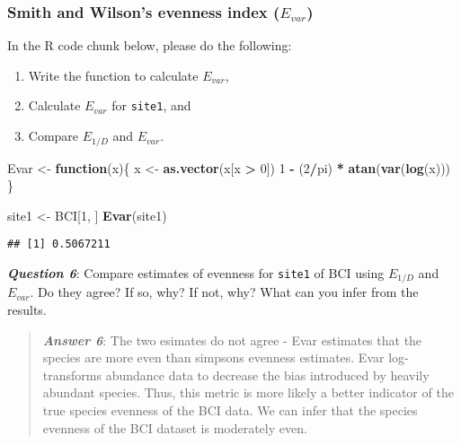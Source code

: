 \documentclass[
]{article}
\newenvironment{Shaded}{\begin{snugshade}}{\end{snugshade}}
\newcommand{\ControlFlowTok}[1]{\textcolor[rgb]{0.13,0.29,0.53}{\textbf{#1}}}
\newcommand{\DecValTok}[1]{\textcolor[rgb]{0.00,0.00,0.81}{#1}}
\newcommand{\FunctionTok}[1]{\textcolor[rgb]{0.13,0.29,0.53}{\textbf{#1}}}
\newcommand{\NormalTok}[1]{#1}
\newcommand{\OtherTok}[1]{\textcolor[rgb]{0.56,0.35,0.01}{#1}}
\newcommand{\SpecialCharTok}[1]{\textcolor[rgb]{0.81,0.36,0.00}{\textbf{#1}}}
\begin{document}
\subsubsection{\texorpdfstring{Smith and Wilson's evenness index
(\(E_{var}\))}{Smith and Wilson's evenness index (E\_\{var\})}}\label{smith-and-wilsons-evenness-index-e_var}

In the R code chunk below, please do the following:

\begin{enumerate}
\def\labelenumi{\arabic{enumi}.}
\item
  Write the function to calculate \(E_{var}\),
\item
  Calculate \(E_{var}\) for \texttt{site1}, and
\item
  Compare \(E_{1/D}\) and \(E_{var}\).
\end{enumerate}

\begin{Shaded}
\begin{Highlighting}[]
\NormalTok{Evar }\OtherTok{\textless{}{-}} \ControlFlowTok{function}\NormalTok{(x)\{}
\NormalTok{  x }\OtherTok{\textless{}{-}} \FunctionTok{as.vector}\NormalTok{(x[x }\SpecialCharTok{\textgreater{}} \DecValTok{0}\NormalTok{])}
  \DecValTok{1} \SpecialCharTok{{-}}\NormalTok{ (}\DecValTok{2}\SpecialCharTok{/}\NormalTok{pi) }\SpecialCharTok{*} \FunctionTok{atan}\NormalTok{(}\FunctionTok{var}\NormalTok{(}\FunctionTok{log}\NormalTok{(x)))}
\NormalTok{  \}}

\NormalTok{site1 }\OtherTok{\textless{}{-}}\NormalTok{ BCI[}\DecValTok{1}\NormalTok{, ]}
\FunctionTok{Evar}\NormalTok{(site1)}
\end{Highlighting}
\end{Shaded}

\begin{verbatim}
## [1] 0.5067211
\end{verbatim}

\textbf{\emph{Question 6}}: Compare estimates of evenness for
\texttt{site1} of BCI using \(E_{1/D}\) and \(E_{var}\). Do they agree?
If so, why? If not, why? What can you infer from the results.

\begin{quote}
\textbf{\emph{Answer 6}}: The two esimates do not agree - Evar estimates
that the species are more even than simpsons evenness estimates. Evar
log-transforms abundance data to decrease the bias introduced by heavily
abundant species. Thus, this metric is more likely a better indicator of
the true species evenness of the BCI data. We can infer that the species
evenness of the BCI dataset is moderately even.
\end{quote}
\end{document}

